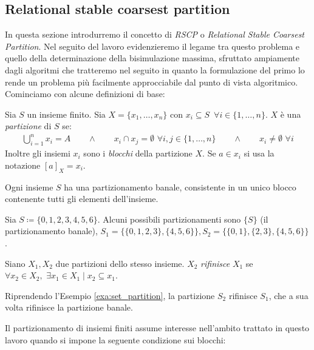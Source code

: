 \subsection{Relational stable coarsest partition}
\label{sec:rscp}
In questa sezione introdurremo il concetto di \emph{RSCP} o \emph{Relational Stable Coarsest Partition}. Nel seguito del lavoro evidenzieremo il legame tra questo problema e quello della determinazione della bisimulazione massima, sfruttato ampiamente dagli algoritmi che tratteremo nel seguito in quanto la formulazione del primo lo rende un problema più facilmente approcciabile dal punto di vista algoritmico.\\
Cominciamo con alcune definizioni di base:
\begin{definition}
    Sia $S$ un insieme finito. Sia $X = \{x_1, \dots, x_n\}$ con $x_i \subseteq S \,\,\,\forall i \in \{1,\dots,n\}$. $X$ è una \emph{partizione} di $S$ se:
    \begin{gather*}
        \bigcup_{i = 1}^n x_i = A \qquad \land \qquad x_i \cap x_j = \emptyset \,\,\forall i,j \in \{1,\dots,n\} \qquad \land \qquad x_i \neq \emptyset \,\,\forall i
    \end{gather*}
    Inoltre gli insiemi $x_i$ sono i \emph{blocchi} della partizione $X$. Se $a \in x_i$ si usa la notazione $[a]_X = x_i$.
\end{definition}
\begin{observation}
    \label{obs:part_banale}
    Ogni insieme $S$ ha una partizionamento banale, consistente in un unico blocco contenente tutti gli elementi dell'insieme.
\end{observation}
\begin{example}
    Sia $S \coloneqq \{0,1,2,3,4,5,6\}$. Alcuni possibili partizionamenti sono $\{S\}$ (il partizionamento banale), $S_1 = \{\{0,1,2,3\},\{4,5,6\}\}, S_2 = \{\{0,1\},\{2,3\},\{4,5,6\}\}$.
    \label{exa:set_partition}
\end{example}
\begin{definition}
    Siano $X_1,X_2$ due partizioni dello stesso insieme. $X_2$ \emph{rifinisce} $X_1$ se $\forall x_2 \in X_2, \,\,\exists x_1 \in X_1 \mid x_2 \subseteq x_1$.
\end{definition}
\begin{example}
    Riprendendo l'Esempio \ref*{exa:set_partition}, la partizione $S_2$ rifinisce $S_1$, che a sua volta rifinisce la partizione banale.
\end{example}
Il partizionamento di insiemi finiti assume interesse nell'ambito trattato in questo lavoro quando si impone la seguente condizione sui blocchi:
